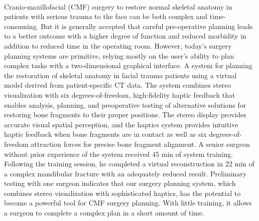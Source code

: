 {{\begin{enumerate}
\\ \aabstract
Cranio-maxillofacial (CMF) surgery to restore normal skeletal anatomy in patients with serious trauma to the face can be both complex and time-consuming. But it is generally accepted that careful pre-operative planning leads to a better outcome with a higher degree of function and reduced morbidity in addition to reduced time in the operating room. However, today's surgery planning systems are primitive, relying mostly on the user's ability to plan complex tasks with a two-dimensional graphical interface. A system for planning the restoration of skeletal anatomy in facial trauma patients using a virtual model derived from patient-specific CT data. The system combines stereo visualization with six degrees-of-freedom, high-fidelity haptic feedback that enables analysis, planning, and preoperative testing of alternative solutions for restoring bone fragments to their proper positions. The stereo display provides accurate visual spatial perception, and the haptics system provides intuitive haptic feedback when bone fragments are in contact as well as six degrees-of-freedom attraction forces for precise bone fragment alignment. A senior surgeon without prior experience of the system received 45 min of system training. Following the training session, he completed a virtual reconstruction in 22 min of a complex mandibular fracture with an adequately reduced result. Preliminary testing with one surgeon indicates that our surgery planning system, which combines stereo visualization with sophisticated haptics, has the potential to become a powerful tool for CMF surgery planning. With little training, it allows a surgeon to complete a complex plan in a short amount of time.


\end{enumerate}}}
